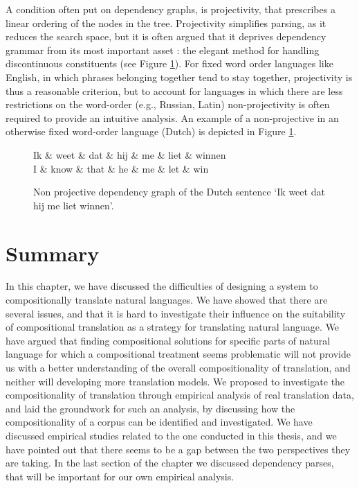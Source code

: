A condition often put on dependency graphs, is projectivity, that prescribes a linear ordering of the nodes in the tree. Projectivity simplifies parsing, as it reduces the search space, but it is often argued that it deprives dependency grammar from its most important asset \citep{covington1990dependency,debusmann2000introduction}: the elegant method for handling discontinuous constituents (see Figure \ref{fig:npdeptree}). For fixed word order languages like English, in which phrases belonging together tend to stay together, projectivity is thus a reasonable criterion, but to account for languages in which there are less restrictions on the word-order (e.g., Russian, Latin) non-projectivity is often required to provide an intuitive analysis. An example of a non-projective in an otherwise fixed word-order language (Dutch) is depicted in Figure \ref{fig:npdeptree}.

\begin{figure}[!ht]
\centering
\begin{dependency}[theme=simple]%
\begin{deptext}[column sep=.5cm, row sep=.1ex]
Ik \& weet \& dat \& hij \& me \& liet \& winnen\\
\tiny{I} \& \tiny{know} \& \tiny{that} \& \tiny{he} \& \tiny{me} \& \tiny{let} \& \tiny{win}\\
\end{deptext}
\end{dependency}
\caption{Non projective dependency graph of the Dutch sentence `Ik weet dat hij me liet winnen'.}\label{fig:npdeptree}
\end{figure}

\section{Summary}
\label{sec:summary}

In this chapter, we have discussed the difficulties of designing a system to compositionally translate natural languages. We have showed that there are several issues, and that it is hard to investigate their influence on the suitability of compositional translation as a strategy for translating natural language. We have argued that finding compositional solutions for specific parts of natural language for which a compositional treatment seems problematic will not provide us with a better understanding of the overall compositionality of translation, and neither will developing more translation models. We proposed to investigate the compositionality of translation through empirical analysis of real translation data, and laid the groundwork for such an analysis, by discussing how the compositionality of a corpus can be identified and investigated. We have discussed empirical studies related to the one conducted in this thesis, and we have pointed out that there seems to be a gap between the two perspectives they are taking. In the last section of the chapter we discussed dependency parses, that will be important for our own empirical analysis.
